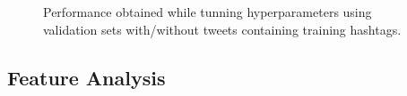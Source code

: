 \begin{figure}[t!]
\begin{centering}
\par\end{centering}
\caption{Performance obtained while tunning hyperparameters using validation sets with/without tweets containing training hashtags.}
\label{fig:ClassifiersRobustness}
\end{figure}






\subsection*{Feature Analysis}
\label{label:featureanalysis}

